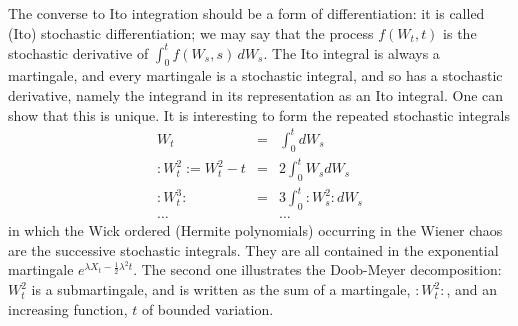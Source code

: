 The converse to Ito integration should be a form of differentiation:
it is called (Ito) stochastic differentiation; we may say that the process
$f(W_t,t)$ is the stochastic derivative of $\int_0^t f(W_s,s)\,dW_s$.
The Ito integral is always a martingale, and every martingale is
a stochastic integral, and so has a stochastic derivative, namely the
integrand in its representation as an Ito integral. One can show that
this is unique. It is interesting to form the repeated stochastic integrals
\begin{eqnarray*}
W_t&=&\int_0^tdW_s\\
:W_t^2:=W_t^2-t&=&2\int_0^tW_sdW_s\\
:W_t^3:&=&3\int_0^t:W_s^2:dW_s\\
\ldots& &\ldots
\end{eqnarray*}
in which the Wick ordered (Hermite polynomials) occurring in the Wiener chaos
are the successive stochastic integrals. They are all contained
in the exponential martingale $e^{\lambda X_t-\frac{1}{2}\lambda^2t}$.
The second one illustrates the Doob-Meyer decomposition: $W_t^2$
is a submartingale, and is written as the sum of a martingale, $:W_t^2:$,
and an increasing function, $t$ of bounded variation.

